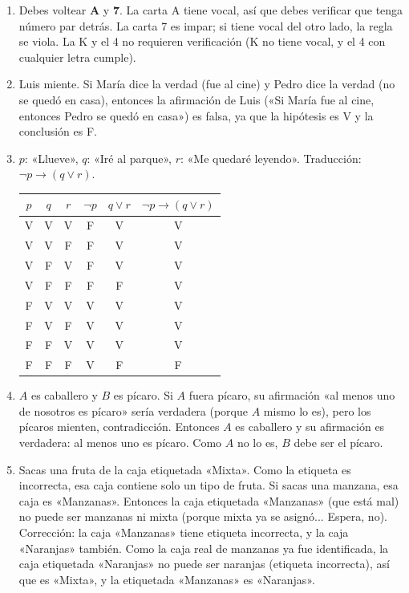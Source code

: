 \documentclass[12pt, a4paper]{article}
\begin{document}
\begin{enumerate}[leftmargin=*, label=\textbf{\arabic*.}]
  \item Debes voltear \textbf{A} y \textbf{7}. La carta A tiene vocal, así que debes verificar que tenga número par detrás. La carta 7 es impar; si tiene vocal del otro lado, la regla se viola. La K y el 4 no requieren verificación (K no tiene vocal, y el 4 con cualquier letra cumple).

  \item Luis miente. Si María dice la verdad (fue al cine) y Pedro dice la verdad (no se quedó en casa), entonces la afirmación de Luis («Si María fue al cine, entonces Pedro se quedó en casa») es falsa, ya que la hipótesis es V y la conclusión es F.

  \item $p$: «Llueve», $q$: «Iré al parque», $r$: «Me quedaré leyendo». Traducción: $\neg p \rightarrow (q \vee r)$.
  \begin{center}
  \small
  \begin{tabular}{ccc|c|c|c}
  $p$ & $q$ & $r$ & $\neg p$ & $q \vee r$ & $\neg p \rightarrow (q \vee r)$ \\
  \hline
  V & V & V & F & V & V \\
  V & V & F & F & V & V \\
  V & F & V & F & V & V \\
  V & F & F & F & F & V \\
  F & V & V & V & V & V \\
  F & V & F & V & V & V \\
  F & F & V & V & V & V \\
  F & F & F & V & F & F \\
  \end{tabular}
  \end{center}

  \item $A$ es caballero y $B$ es pícaro. Si $A$ fuera pícaro, su afirmación «al menos uno de nosotros es pícaro» sería verdadera (porque $A$ mismo lo es), pero los pícaros mienten, contradicción. Entonces $A$ es caballero y su afirmación es verdadera: al menos uno es pícaro. Como $A$ no lo es, $B$ debe ser el pícaro.

  \item Sacas una fruta de la caja etiquetada «Mixta». Como la etiqueta es incorrecta, esa caja contiene solo un tipo de fruta. Si sacas una manzana, esa caja es «Manzanas». Entonces la caja etiquetada «Manzanas» (que está mal) no puede ser manzanas ni mixta (porque mixta ya se asignó... Espera, no). Corrección: la caja «Manzanas» tiene etiqueta incorrecta, y la caja «Naranjas» también. Como la caja real de manzanas ya fue identificada, la caja etiquetada «Naranjas» no puede ser naranjas (etiqueta incorrecta), así que es «Mixta», y la etiquetada «Manzanas» es «Naranjas».


\end{enumerate}
\end{document}
